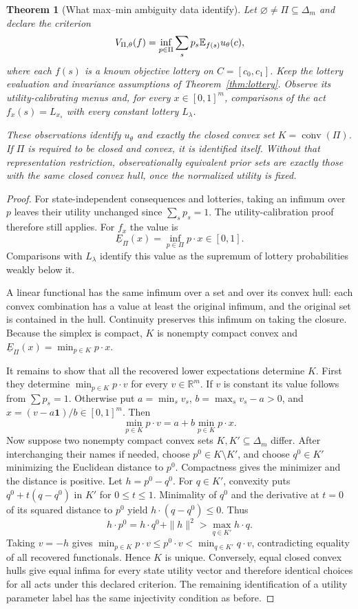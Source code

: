 \documentclass[11pt,a4paper]{article}
\newtheorem{theorem}{Theorem}[section]
\theoremstyle{definition}\newtheorem{definition}[theorem]{Definition}
\theoremstyle{remark}\newtheorem{remark}[theorem]{Remark}
\newcommand{\R}{\mathbb R}\newcommand{\Q}{\mathbb Q}
\newcommand{\1}{\mathbf 1}
\newcommand{\conv}{\operatorname{conv}}
\begin{document}
\begin{theorem}[What max--min ambiguity data identify]\label{thm:ambiguity}
Let $\varnothing\ne\Pi\subseteq\Delta_m$ and declare the criterion
\[
 V_{\Pi,\theta}(f)=\inf_{p\in\Pi}\sum_s p_s\mathbb E_{f(s)}u_\theta(c),
\]
where each $f(s)$ is a known objective lottery on $C=[c_0,c_1]$. Keep the lottery evaluation and invariance assumptions of Theorem~\ref{thm:lottery}. Observe its utility-calibrating menus and, for every $x\in[0,1]^m$, comparisons of the act $f_x(s)=L_{x_s}$ with every constant lottery $L_\lambda$.

These observations identify $u_\theta$ and exactly the closed convex set
$K=\overline{\conv}(\Pi)$. If $\Pi$ is required to be closed and convex, it is identified itself. Without that representation restriction, observationally equivalent prior sets are exactly those with the same closed convex hull, once the normalized utility is fixed.
\end{theorem}
\begin{proof}
For state-independent consequences and lotteries, taking an infimum over $p$ leaves their utility unchanged since $\sum_sp_s=1$. The utility-calibration proof therefore still applies. For $f_x$ the value is
\[
 \underline E_\Pi(x)=\inf_{p\in\Pi}p\cdot x\in[0,1].
\]
Comparisons with $L_\lambda$ identify this value as the supremum of lottery probabilities weakly below it.

A linear functional has the same infimum over a set and over its convex hull: each convex combination has a value at least the original infimum, and the original set is contained in the hull. Continuity preserves this infimum on taking the closure. Because the simplex is compact, $K$ is nonempty compact convex and
$\underline E_\Pi(x)=\min_{p\in K}p\cdot x$.

It remains to show that all the recovered lower expectations determine $K$. First they determine $\min_{p\in K}p\cdot v$ for every $v\in\R^m$. If $v$ is constant its value follows from $\sum p_s=1$. Otherwise put $a=\min_sv_s$, $b=\max_sv_s-a>0$, and $x=(v-a\1)/b\in[0,1]^m$. Then
\[
 \min_{p\in K}p\cdot v=a+b\min_{p\in K}p\cdot x.
\]
Now suppose two nonempty compact convex sets $K,K'\subseteq\Delta_m$ differ. After interchanging their names if needed, choose $p^0\in K\setminus K'$, and choose $q^0\in K'$ minimizing the Euclidean distance to $p^0$. Compactness gives the minimizer and the distance is positive. Let $h=p^0-q^0$. For $q\in K'$, convexity puts $q^0+t(q-q^0)$ in $K'$ for $0\le t\le1$. Minimality of $q^0$ and the derivative at $t=0$ of its squared distance to $p^0$ yield $h\cdot(q-q^0)\le0$. Thus
\[
 h\cdot p^0=h\cdot q^0+\|h\|^2>\max_{q\in K'}h\cdot q.
\]
Taking $v=-h$ gives
$\min_{p\in K}p\cdot v\le p^0\cdot v<\min_{q\in K'}q\cdot v$,
contradicting equality of all recovered functionals. Hence $K$ is unique. Conversely, equal closed convex hulls give equal infima for every state utility vector and therefore identical choices for all acts under this declared criterion. The remaining identification of a utility parameter label has the same injectivity condition as before.
\end{proof}
\end{document}
